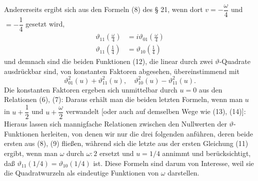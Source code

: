 Andererseits ergibt sich aus den Formeln (8) des § 21, wenn dort $v = -\dfrac{\omega}{4}$ und $= -\dfrac{1}{4}$ gesetzt wird,
\[
\begin{aligned}
\vartheta_{11}\left(\frac{\omega}{4}\right) &= i\vartheta_{01}\left(\frac{\omega}{4}\right) \\
\vartheta_{11}\left(\frac{1}{4}\right) &= \vartheta_{10}\left(\frac{1}{4}\right)
\end{aligned}
\]
und demnach sind die beiden Funktionen (12), die linear durch zwei $\vartheta$-Quadrate ausdrückbar sind, von konstanten Faktoren abgesehen, übereinstimmend mit
\[
\vartheta_{01}^2(u) + \vartheta_{11}^2(u), \quad \vartheta_{10}^2(u) - \vartheta_{11}^2(u).
\]
Die konstanten Faktoren ergeben sich unmittelbar durch $u = 0$ aus den Relationen (6), (7):
Daraus erhält man die beiden letzten Formeln, wenn man $u$ in $u + \dfrac{1}{2}$ und $u + \dfrac{\omega}{2}$ verwandelt [oder auch auf demselben Wege wie (13), (14)]:
Hieraus lassen sich mannigfache Relationen zwischen den Nullwerten der $\vartheta$-Funktionen herleiten, von denen wir nur die drei folgenden anführen, deren beide ersten aus (8), (9) fließen, während sich die letzte aus der ersten Gleichung (11) ergibt, wenn man $\omega$ durch $\omega{:}2$ ersetzt und $u = 1/4$ annimmt und berücksichtigt, daß $\vartheta_{11}(1/4) = \vartheta_{10}(1/4)$ ist.
Diese Formeln sind darum von Interesse, weil sie die Quadratwurzeln als eindeutige Funktionen von $\omega$ darstellen.
